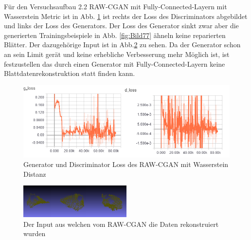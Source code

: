 \documentclass{llncs}
\begin{document}
Für den Versuchsaufbau 2.2 RAW-CGAN mit Fully-Connected-Layern mit Wasserstein Metric ist in Abb. \ref{fig:Bild75} ist rechts der Loss des Discriminators abgebildet und links der Loss des Generators. Der Loss des Generator sinkt zwar aber die generierten Trainingsbeispiele in Abb. \ref{fig:Bild77} ähneln keine reparierten Blätter.  Der dazugehörige Input ist in Abb.\ref{fig:Bild76} zu sehen. Da der Generator schon an sein Limit gerät und keine erhebliche Verbesserung mehr Möglich ist, ist festzustellen das durch einen Generator mit Fully-Connected-Layern keine Blattdatenrekonstruktion statt finden kann. 

\begin{figure}[htbp] 
	\centering
	\includegraphics[width=1.0\textwidth]{wasserstein_fully_connected_rawcgan_loss.png}
	\caption{Generator und Discriminator Loss des RAW-CGAN mit Wasserstein Distanz}
	\label{fig:Bild75}
\end{figure}

\begin{figure}[htbp] 
	\centering
	\includegraphics[width=0.5\textwidth]{reaf_fully_connected_wgan_.png}
	\caption{Der Input aus welchen vom RAW-CGAN die Daten rekonstruiert wurden}
	\label{fig:Bild76}
\end{figure}
\end{document}
